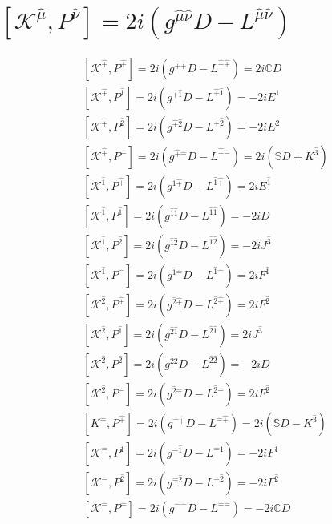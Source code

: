 \documentclass[]{article}
\numberwithin{equation}{section}
\begin{document}
\section{$\left[\mathcal{K}^{\hat{\mu}},P^{\hat{\nu}}\right]=2i\left(g^{\hat{\mu}\hat{\nu}}D-L^{\hat{\mu}\hat{\nu}}\right)$}
\begin{align}
    &\left[\mathcal{K}^{\hat{+}},P^{\hat{+}}\right]=2i\left(g^{\hat{+}\hat{+}}D-L^{\hat{+}\hat{+}}\right)=2i\mathbb{C}D\\
    &\left[\mathcal{K}^{\hat{+}},P^{\hat{1}}\right]=2i\left(g^{\hat{+}\hat{1}}D-L^{\hat{+}\hat{1}}\right)=-2iE^{\hat{1}}\\
    &\left[\mathcal{K}^{\hat{+}},P^{\hat{2}}\right]=2i\left(g^{\hat{+}\hat{2}}D-L^{\hat{+}\hat{2}}\right)=-2iE^{\hat{2}}\\
    &\left[\mathcal{K}^{\hat{+}},P^{\hat{-}}\right]=2i\left(g^{\hat{+}\hat{-}}D-L^{\hat{+}\hat{-}}\right)=2i\left(\mathbb{S}D+K^{\hat{3}}\right)\\
    &\left[\mathcal{K}^{\hat{1}},P^{\hat{+}}\right]=2i\left(g^{\hat{1}\hat{+}}D-L^{\hat{1}\hat{+}}\right)=2iE^{\hat{1}}\\
    &\left[\mathcal{K}^{\hat{1}},P^{\hat{1}}\right]=2i\left(g^{\hat{1}\hat{1}}D-L^{\hat{1}\hat{1}}\right)=-2iD\\
    &\left[\mathcal{K}^{\hat{1}},P^{\hat{2}}\right]=2i\left(g^{\hat{1}\hat{2}}D-L^{\hat{1}\hat{2}}\right)=-2iJ^{\hat{3}}\\
    &\left[\mathcal{K}^{\hat{1}},P^{\hat{-}}\right]=2i\left(g^{\hat{1}\hat{-}}D-L^{\hat{1}\hat{-}}\right)=2iF^{\hat{1}}\\
    &\left[\mathcal{K}^{\hat{2}},P^{\hat{+}}\right]=2i\left(g^{\hat{2}\hat{+}}D-L^{\hat{2}\hat{+}}\right)=2iF^{\hat{2}}\\
    &\left[\mathcal{K}^{\hat{2}},P^{\hat{1}}\right]=2i\left(g^{\hat{2}\hat{1}}D-L^{\hat{2}\hat{1}}\right)=2iJ^{\hat{3}}\\
    &\left[\mathcal{K}^{\hat{2}},P^{\hat{2}}\right]=2i\left(g^{\hat{2}\hat{2}}D-L^{\hat{2}\hat{2}}\right)=-2iD\\
    &\left[\mathcal{K}^{\hat{2}},P^{\hat{-}}\right]=2i\left(g^{\hat{2}\hat{-}}D-L^{\hat{2}\hat{-}}\right)=2iF^{\hat{2}}\\
    &\left[K^{\hat{-}},P^{\hat{+}}\right]=2i\left(g^{\hat{-}\hat{+}}D-L^{\hat{-}\hat{+}}\right)=2i\left(\mathbb{S}D-K^{\hat{3}}\right)\\
    &\left[\mathcal{K}^{\hat{-}},P^{\hat{1}}\right]=2i\left(g^{\hat{-}\hat{1}}D-L^{\hat{-}\hat{1}}\right)=-2iF^{\hat{1}}\\
    &\left[\mathcal{K}^{\hat{-}},P^{\hat{2}}\right]=2i\left(g^{\hat{-}\hat{2}}D-L^{\hat{-}\hat{2}}\right)=-2iF^{\hat{2}}\\
    &\left[\mathcal{K}^{\hat{-}},P^{\hat{-}}\right]=2i\left(g^{\hat{-}\hat{-}}D-L^{\hat{-}\hat{-}}\right)=-2i\mathbb{C}D
\end{align}
\end{document}
